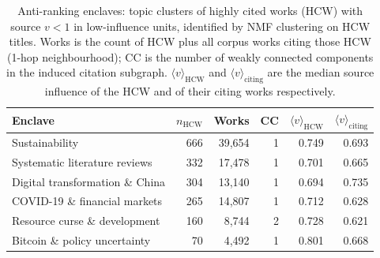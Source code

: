 \begin{table}[!htbp]
  \centering
  \caption{Anti-ranking enclaves: topic clusters of highly cited works (HCW) with source $v < 1$ in low-influence units, identified by NMF clustering on HCW titles. Works is the count of HCW plus all corpus works citing those HCW (1-hop neighbourhood); CC is the number of weakly connected components in the induced citation subgraph. $\langle v \rangle_{\text{HCW}}$ and $\langle v \rangle_{\text{citing}}$ are the median source influence of the HCW and of their citing works respectively.}
  \label{tab:enclaves}
  \small
  \begin{tabular}{lrrrrr}
    \toprule
    Enclave & $n_{\text{HCW}}$ & Works & CC & $\langle v \rangle_{\text{HCW}}$ & $\langle v \rangle_{\text{citing}}$ \\
    \midrule
    Sustainability & 666 & 39,654 & 1 & 0.749 & 0.693 \\
    Systematic literature reviews & 332 & 17,478 & 1 & 0.701 & 0.665 \\
    Digital transformation \& China & 304 & 13,140 & 1 & 0.694 & 0.735 \\
    COVID-19 \& financial markets & 265 & 14,807 & 1 & 0.712 & 0.628 \\
    Resource curse \& development & 160 & 8,744 & 2 & 0.728 & 0.621 \\
    Bitcoin \& policy uncertainty & 70 & 4,492 & 1 & 0.801 & 0.668 \\
    \bottomrule
  \end{tabular}
\end{table}
